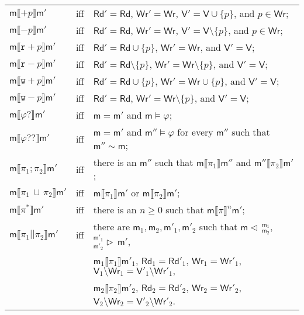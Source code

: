 \documentclass{llncs}
\newcommand{\modl}{\mathsf m}
\newcommand{\mrg}[3]{ ^{#2}_{#3} \triangleright \, #1 }
\newcommand{\pll}{ {||} }							%
\newcommand{\splt}[3]{ #1 \triangleleft \, ^{#2}_{#3} }
\newcommand{\readset}{\mathsf{Rd}}
\newcommand{\valuset}{\mathsf{V}}
\newcommand{\writeset}{\mathsf{Wr}}
\newcommand{\testendo}{?\!\!?}			%
\newcommand{\testpdl}{?}				%
\newcommand{\assgntopR}[1]{{\mathtt r {+} #1}}
\newcommand{\assgnbotR}[1]{{\mathtt r {-} #1}}
\newcommand{\assgntopW}[1]{{\mathtt w {+} #1}}
\newcommand{\assgnbotW}[1]{{\mathtt w {-} #1}}
\newcommand{\assgntopV}[1]{{\mathtt {+} #1}}
\newcommand{\assgnbotV}[1]{{\mathtt {-} #1}}
\newcommand{\intPgm}[1]{\llbracket #1 \rrbracket}
\newcommand{\ldia}[1]{ \big\langle #1 \big\rangle}
\newcommand{\leqv}{ \leftrightarrow }
\newcommand{\ndet}{\,{\cup}\,}
\renewcommand{\phi}{\varphi}
\newcommand{\propset}{\mathbb P}
\newcommand{\propsetOf}[1]{\propset_{#1}}
\begin{document}
\begin{center}\begin{tabular}{lll}
$\modl \intPgm{ \assgntopV{p} } \modl'$ & iff & $\readset' = \readset$, $\writeset' = \writeset $, $\valuset' = \valuset \cup \{p\} $, and $p \in \writeset$;
\\
$\modl \intPgm{ \assgnbotV{p} } \modl'$ & iff & $\readset' = \readset$, $\writeset' = \writeset $, $\valuset' = \valuset \setminus \{p\} $, and $p \in \writeset$;
\\
$\modl \intPgm{ \assgntopR{p} } \modl'$ & iff & $\readset' = \readset \cup \{p\} $, $\writeset' = \writeset $, and $\valuset'= \valuset$;
\\
$\modl \intPgm{ \assgnbotR{p} } \modl'$ & iff & $\readset' = \readset \setminus \{p\} $, $\writeset' = \writeset \setminus \{p\}$, and $\valuset'= \valuset$;
\\
$\modl \intPgm{ \assgntopW{p} } \modl'$ & iff & $\readset' = \readset \cup \{p\} $, $\writeset' = \writeset \cup \{p\} $, and $\valuset' = \valuset$;
\\
$\modl \intPgm{ \assgnbotW{p} } \modl'$ & iff & $\readset' = \readset$, $\writeset' = \writeset  \setminus \{p\} $, and $\valuset' = \valuset$;
\\
$\modl \intPgm{ \phi \testpdl }\modl'$ & iff & $\modl = \modl'$ and $\modl \models \phi$;
\\
$\modl \intPgm{ \phi \testendo }\modl'$ & iff & $\modl = \modl'$ and $\modl'' \models \phi$ for every $\modl''$ such that $\modl'' \sim \modl$;
\\
$\modl \intPgm{ \pi_1 ; \pi_2 } \modl'$ & iff & there is an $\modl''$ such that $\modl \intPgm{ \pi_1 } \modl''$ and 
												$\modl'' \intPgm{ \pi_2 } \modl'$;
\\
$\modl \intPgm{ \pi_1 \ndet \pi_2 } \modl'$ & iff & $\modl \intPgm{ \pi_1 } \modl'$ or $\modl \intPgm{ \pi_2 } \modl'$;
\\
$\modl \intPgm{ \pi^\ast } \modl'$ & iff & there is an $n \geq 0 $ such that $\modl \intPgm{ \pi } ^n \modl'$;
\\
$\modl \intPgm{ \pi_1 \pll \pi_2 } \modl'$ & iff & there are $\modl_1, \modl_2, \modl'_1, \modl'_2$ such that %
$\splt{\modl}{\modl_1} {\modl_2} $, $\mrg{\modl'}{\modl'_1} {\modl'_2} $, \\&&
$\modl_1 \intPgm{ \pi_1 } \modl'_1$, 
$\readset_1 = \readset'_1 $, $\writeset_1 = \writeset'_1 $, $\valuset_1 \setminus \writeset_1 = \valuset'_1 \setminus \writeset'_1 , $ \\&&
$\modl_2 \intPgm{ \pi_2 } \modl'_2$, 
$\readset_2 = \readset'_2 $, $\writeset_2 = \writeset'_2 $, $\valuset_2 \setminus \writeset_2 = \valuset'_2 \setminus \writeset'_2 $. 
\end{tabular}\end{center}
\end{document}
